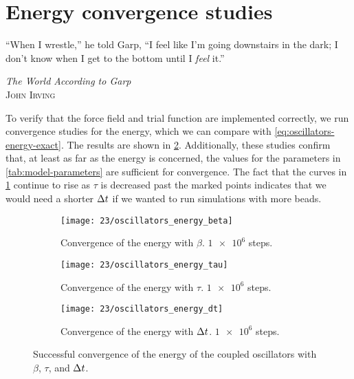 \section{Energy convergence studies}

\label{sec:oscillators-energy-convergence}

\epigraph{
``When I wrestle,'' he told Garp, ``I feel like I'm going downstairs in the dark; I don't know when I get to the bottom until I \emph{feel} it.''
}{
\textit{The World According to Garp} \\
\textsc{John Irving}
}

To verify that the force field and trial function are implemented correctly, we run convergence studies for the energy, which we can compare with \cref{eq:oscillators-energy-exact}.
The results are shown in \cref{fig:oscillators-energy}.
Additionally, these studies confirm that, at least as far as the energy is concerned, the values for the parameters in \vref{tab:model-parameters} are sufficient for convergence.
The fact that the curves in \cref{fig:oscillators-energy-tau} continue to rise as $\tau$ is decreased past the marked points indicates that we would need a shorter $\Delta t$ if we wanted to run simulations with more beads.

\begin{figure}
	\setlength{\figspacing}{2 mm}
	\centering
	\begin{subfigure}[b]{\textwidth}
		\texttt{[image: 23/oscillators\_energy\_beta]}
		\caption{
			Convergence of the energy with $\beta$.
			$\num{1e6}$ steps.
		}
		\vspace{\figspacing}
	\end{subfigure}
	\begin{subfigure}[b]{\textwidth}
		\texttt{[image: 23/oscillators\_energy\_tau]}
		\caption{
			Convergence of the energy with $\tau$.
			$\num{1e6}$ steps.
		}
		\label{fig:oscillators-energy-tau}
		\vspace{\figspacing}
	\end{subfigure}
	\begin{subfigure}[b]{\textwidth}
		\texttt{[image: 23/oscillators\_energy\_dt]}
		\caption{
			Convergence of the energy with $\Delta t$.
			$\num{1e6}$ steps.
		}
	\end{subfigure}
	\caption[
		Convergence of energy for coupled oscillators
	]{
		Successful convergence of the energy of the coupled oscillators with $\beta$, $\tau$, and $\Delta t$.
		\explainplotentropy{}
	}
	\label{fig:oscillators-energy}
\end{figure}

